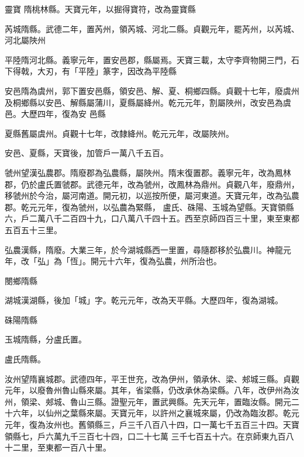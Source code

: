 \begin{pinyinscope}
 靈寶
 隋桃林縣。天寶元年，以掘得寶符，改為靈寶縣



 芮城隋縣。武德二年，置芮州，領芮城、河北二縣。貞觀元年，罷芮州，以芮城、河北屬陜州



 平陸隋河北縣。義寧元年，置安邑郡，縣屬焉。天寶三載，太守李齊物開三門，石下得戟，大刃，有「平陸」篆字，因改為平陸縣



 安邑隋為虞州，郭下置安邑縣，領安邑、解、夏、桐鄉四縣。貞觀十七年，廢虞州及桐鄉縣以安邑、解縣屬蒲川，夏縣屬絳州。乾元元年，割屬陜州，改安邑為虞邑。大歷四年，復為安
 邑縣



 夏縣舊屬虞州。貞觀十七年，改隸絳州。乾元元年，改屬陜州。



 安邑、夏縣，天寶後，加管戶一萬八千五百。



 虢州望漢弘農郡。隋廢郡為弘農縣，屬陜州。隋末復置郡。義寧元年，改為鳳林郡，仍於盧氏置虢郡。武德元年，改為虢州，改鳳林為鼎州。貞觀八年，廢鼎州，移虢州於今治，屬河南道。開元初，以巡按所便，屬河東道。天寶元年，改為弘農郡。乾元元年，復為虢州，以弘農為緊縣，
 盧氏、硃陽、玉城為望縣。天寶領縣六，戶二萬八千二百四十九，口八萬八千四十五。西至京師四百三十里，東至東都五百五十三里。



 弘農漢縣，隋廢。大業三年，於今湖城縣西一里置，尋隨郡移於弘農川。神龍元年，改「弘」為「恆」。開元十六年，復為弘農，州所治也。



 閿鄉隋縣



 湖城漢湖縣，後加「城」字。乾元元年，改為天平縣。大歷四年，復為湖城。



 硃陽隋縣



 玉城隋縣，分盧氏置。



 盧氏隋縣。



 汝州望隋襄城郡。武德四年，平王世充，改為伊州，領承休、梁、郟城三縣。貞觀元年，以廢魯州魯山縣來屬。其年，省梁縣，仍改承休為梁縣。八年，改伊州為汝州，領梁、郟城、魯山三縣。證聖元年，置武興縣。先天元年，置臨汝縣。開元二十六年，以仙州之葉縣來屬。天寶元年，以許州之襄城來屬，仍改為臨汝郡。乾元元年，復為汝州也。舊領縣三，戶三千八百八十四，口一萬七千五百三十四。天寶領縣七，戶六萬九千三百七十四，口二十七萬
 三千七百五十六。在京師東九百八十二里，至東都一百八十里。




\end{pinyinscope}
